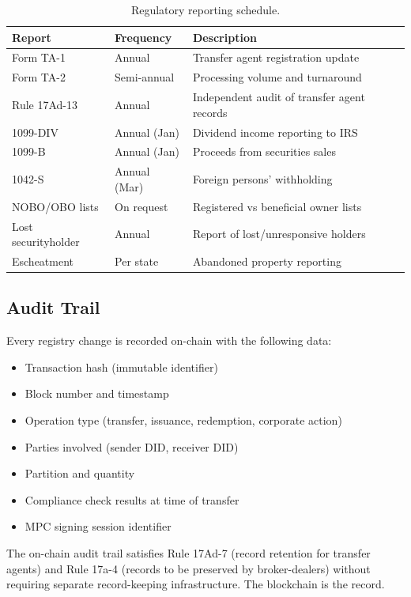 \documentclass[11pt,a4paper]{article}
\begin{document}
\begin{table}[H]
\centering
\caption{Regulatory reporting schedule.}
\label{tab:reports}
\begin{tabular}{llp{5.5cm}}
\toprule
\textbf{Report} & \textbf{Frequency} & \textbf{Description} \\
\midrule
Form TA-1 & Annual & Transfer agent registration update \\
Form TA-2 & Semi-annual & Processing volume and turnaround \\
Rule 17Ad-13 & Annual & Independent audit of transfer agent records \\
1099-DIV & Annual (Jan) & Dividend income reporting to IRS \\
1099-B & Annual (Jan) & Proceeds from securities sales \\
1042-S & Annual (Mar) & Foreign persons' withholding \\
NOBO/OBO lists & On request & Registered vs beneficial owner lists \\
Lost securityholder & Annual & Report of lost/unresponsive holders \\
Escheatment & Per state & Abandoned property reporting \\
\bottomrule
\end{tabular}
\end{table}

\subsection{Audit Trail}

Every registry change is recorded on-chain with the following data:

\begin{itemize}[nosep]
  \item Transaction hash (immutable identifier)
  \item Block number and timestamp
  \item Operation type (transfer, issuance, redemption, corporate action)
  \item Parties involved (sender DID, receiver DID)
  \item Partition and quantity
  \item Compliance check results at time of transfer
  \item MPC signing session identifier
\end{itemize}

The on-chain audit trail satisfies Rule 17Ad-7 (record retention for transfer agents) and Rule 17a-4 (records to be preserved by broker-dealers) without requiring separate record-keeping infrastructure. The blockchain is the record.
\end{document}
